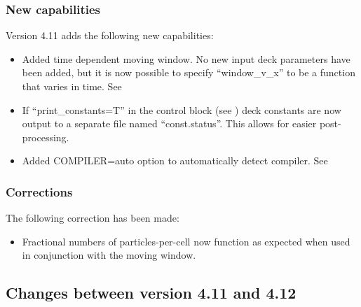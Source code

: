 \subsubsection{New capabilities}
Version 4.11 adds the following new capabilities:

\begin{itemize}
\item Added time dependent moving window. No new input deck parameters have
    been added, but it is now possible to specify ``window\_v\_x'' to be a
    function that varies in time. See 
\item If ``print\_constants=T'' in the control block (see )
    deck constants are now output to a separate file named ``const.status''.
    This allows for easier post-processing.
\item Added COMPILER=auto option to automatically detect compiler. See
\end{itemize}

\subsubsection{Corrections}

The following correction has been made:
\begin{itemize}
\item Fractional numbers of particles-per-cell now function as expected when
used in conjunction with the moving window.
\end{itemize}
\bigskip


\subsection{Changes between version 4.11 and 4.12}

